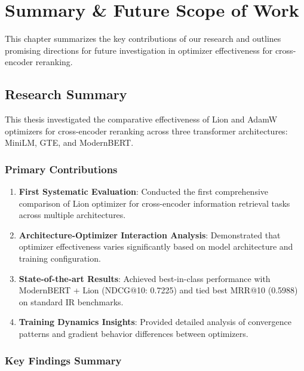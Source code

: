 
\chapter{Summary \& Future Scope of Work}
\label{Chapter6}

This chapter summarizes the key contributions of our research and outlines promising directions for future investigation in optimizer effectiveness for cross-encoder reranking.

\section{Research Summary}

This thesis investigated the comparative effectiveness of Lion and AdamW optimizers for cross-encoder reranking across three transformer architectures: MiniLM, GTE, and ModernBERT.

\subsection{Primary Contributions}

\begin{enumerate}
    \item \textbf{First Systematic Evaluation}: Conducted the first comprehensive comparison of Lion optimizer for cross-encoder information retrieval tasks across multiple architectures.
    
    \item \textbf{Architecture-Optimizer Interaction Analysis}: Demonstrated that optimizer effectiveness varies significantly based on model architecture and training configuration.
    
    \item \textbf{State-of-the-art Results}: Achieved best-in-class performance with ModernBERT + Lion (NDCG@10: 0.7225) and tied best MRR@10 (0.5988) on standard IR benchmarks.
    
    \item \textbf{Training Dynamics Insights}: Provided detailed analysis of convergence patterns and gradient behavior differences between optimizers.
\end{enumerate}

\subsection{Key Findings Summary}

